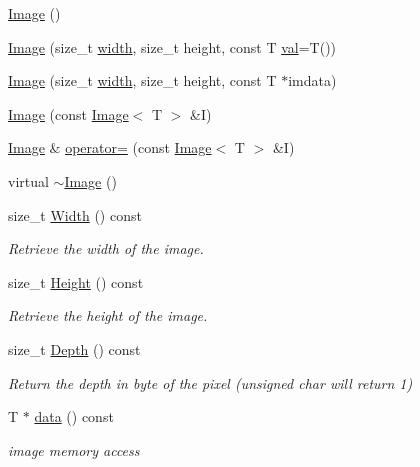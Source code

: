 \begin{DoxyCompactItemize}
\item 
\hyperlink{classImage_a889b7256a9d9df6ed3dee42a08794274}{Image} ()
\item 
\hyperlink{classImage_af13d46d721b7ee7f6517f2fa5840ef56}{Image} (size\+\_\+t \hyperlink{png_8h_ad46179dbe9c68fdcea52b34c3480ec0f}{width}, size\+\_\+t height, const T \hyperlink{jpeglib_8h_aa0ccb5ee6d882ee3605ff47745c6467b}{val}=T())
\item 
\hyperlink{classImage_af2f52548203c77be63f82d634106fb49}{Image} (size\+\_\+t \hyperlink{png_8h_ad46179dbe9c68fdcea52b34c3480ec0f}{width}, size\+\_\+t height, const T $\ast$imdata)
\item 
\hyperlink{classImage_a2657143ec64e1b0ff259cd69acf684b2}{Image} (const \hyperlink{classImage}{Image}$<$ T $>$ \&I)
\item 
\hyperlink{classImage}{Image} \& \hyperlink{classImage_afb4bc519119333df573225437df76f0a}{operator=} (const \hyperlink{classImage}{Image}$<$ T $>$ \&I)
\item 
virtual \hyperlink{classImage_a442db396da0128536b9903407c85ec81}{$\sim$\+Image} ()
\item 
size\+\_\+t \hyperlink{classImage_ab990be0777e20426a1fff829d11763dd}{Width} () const 
\begin{DoxyCompactList}\small\item\em Retrieve the width of the image. \end{DoxyCompactList}\item 
size\+\_\+t \hyperlink{classImage_ac6f50b73173a066f035b2a8c3a8e0bed}{Height} () const 
\begin{DoxyCompactList}\small\item\em Retrieve the height of the image. \end{DoxyCompactList}\item 
size\+\_\+t \hyperlink{classImage_a79cd5a98818f7b6ad94c05172e59923b}{Depth} () const 
\begin{DoxyCompactList}\small\item\em Return the depth in byte of the pixel (unsigned char will return 1) \end{DoxyCompactList}\item 
T $\ast$ \hyperlink{classImage_a819025b2a8a13f50c5231267f24b6ece}{data} () const 
\begin{DoxyCompactList}\small\item\em image memory access \end{DoxyCompactList}\item 

\end{DoxyCompactItemize}
